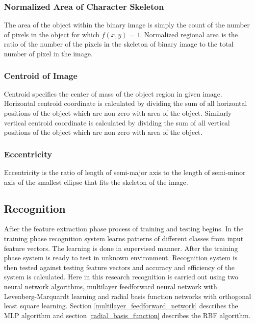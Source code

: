 \documentclass[12pt,a4paper,oneside]{article}
\numberwithin{equation}{section}
\numberwithin{algorithm}{section}
\begin{document}
	\subsubsection{Normalized Area of Character Skeleton}
	\label{area}
	The area of the object within the binary image is simply the count of the number of pixels in the object for which $ f(x,y)=1 $. Normalized regional area is the ratio of the number of the pixels in the skeleton of binary image to the total number of pixel in the image.
	
	\subsubsection{Centroid of Image}
	\label{centroid}
	
	Centroid specifies the center of mass of the object region in given image. Horizontal centroid coordinate is calculated by dividing the sum of all horizontal positions of the object which are non zero with area of the object. Similarly vertical centroid coordinate is calculated by dividing the sum of all vertical positions of the object which are non zero with area of the object.
	
	\subsubsection{Eccentricity}
	\label{eccentricity}
	Eccentricity is the ratio of length of semi-major axis to the length of semi-minor axis of the smallest ellipse that fits the skeleton of the image.
	
	
	\subsection{Recognition}
	\label{recognition}
	After the feature extraction phase process of training and testing begins. In the training phase recognition system learns patterns of different classes from input feature vectors. The learning is done in supervised manner. After the training phase system is ready to test in unknown environment. Recognition system is then tested against testing feature vectors and accuracy and efficiency of the system is calculated. Here in this research recognition is carried out using two neural network algorithms, multilayer feedforward neural network with Levenberg-Marquardt learning and radial basis function networks with orthogonal least square learning. Section \ref{multilayer_feedforward_network} describes the MLP algorithm and section \ref{radial_basis_function} describes the RBF algorithm.
	
\end{document}
